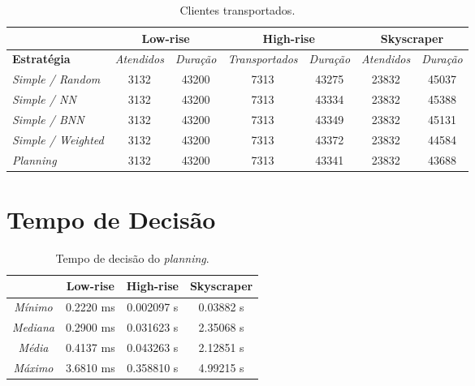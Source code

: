\begin{table}[htb]
\centering
\caption{Clientes transportados.}
\label{table:results:clients}
\begin{tabular}{|l|c|c|c|c|c|c|}
\hline
\textbf{}                  & \multicolumn{2}{c|}{\textbf{Low-rise}} & \multicolumn{2}{c|}{\textbf{High-rise}} & \multicolumn{2}{c|}{\textbf{Skyscraper}} \\ \hline
\textbf{Estratégia}        & \textit{Atendidos}  & \textit{Duração} & \textit{Transportados}  & \textit{Duração}  & \textit{Atendidos}   & \textit{Duração}  \\ \hline
\textit{Simple / Random}   & 3132                & 43200            & 7313                & 43275             & 23832                & 45037             \\ \hline
\textit{Simple / NN}       & 3132                & 43200            & 7313                & 43334             & 23832                & 45388             \\ \hline
\textit{Simple / BNN}      & 3132                & 43200            & 7313                & 43349             & 23832                & 45131             \\ \hline
\textit{Simple / Weighted} & 3132                & 43200            & 7313                & 43372             & 23832                & 44584             \\ \hline
\textit{Planning}          & 3132                & 43200            & 7313                & 43341             & 23832                & 43688             \\ \hline
\end{tabular}
\end{table}

\section{Tempo de Decisão}

\begin{table}[htb]
\centering
\caption{Tempo de decisão do \textit{planning}.}
\label{table:results:skyscraper:time}
\begin{tabular}{|c|c|c|c|}
\hline
                 & \textbf{Low-rise} & \textbf{High-rise} & \textbf{Skyscraper} \\ \hline
\textit{Mínimo}  & 0.2220 ms         & 0.002097 s         & 0.03882 s           \\ \hline
\textit{Mediana} & 0.2900 ms         & 0.031623 s         & 2.35068 s           \\ \hline
\textit{Média}   & 0.4137 ms         & 0.043263 s         & 2.12851 s           \\ \hline
\textit{Máximo}  & 3.6810 ms         & 0.358810 s         & 4.99215 s           \\ \hline
\end{tabular}
\end{table}

